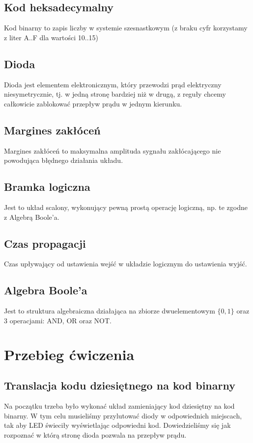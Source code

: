 \documentclass[a4paper,11pt]{article}
\begin{document}
\subsection{Kod heksadecymalny}
Kod binarny to zapis liczby w systemie szesnastkowym (z braku cyfr korzystamy z liter A..F dla wartości 10..15)

\subsection{Dioda}
Dioda jest elementem elektronicznym, który przewodzi prąd elektryczny niesymetrycznie, tj. w jedną stronę bardziej niż w drugą, z reguły chcemy całkowicie zablokować przepływ prądu w jednym kierunku.

\subsection{Margines zakłóceń}
Margines zakłóceń to maksymalna amplituda sygnału zakłócającego nie powodująca błędnego działania układu.

\subsection{Bramka logiczna}
Jest to układ scalony, wykonujący pewną prostą operację logiczną, np. te zgodne z Algebrą Boole'a.

\subsection{Czas propagacji}
Czas upływający od ustawienia wejść w układzie logicznym do ustawienia wyjść.

\subsection{Algebra Boole'a}
Jest to struktura algebraiczna działająca na zbiorze dwuelementowym $\{0,1\}$ oraz 3 operacjami: AND, OR oraz NOT.

\section{Przebieg ćwiczenia}

\subsection{Translacja kodu dziesiętnego na kod binarny}
Na początku trzeba było wykonać układ zamieniający kod dziesiętny na kod binarny. W tym celu musieliśmy przylutować diody w odpowiednich miejscach, tak aby LED świeciły wyświetlając odpowiedni kod. Dowiedzieliśmy się jak rozpoznać w którą stronę dioda pozwala na przepływ prądu.
\end{document}
